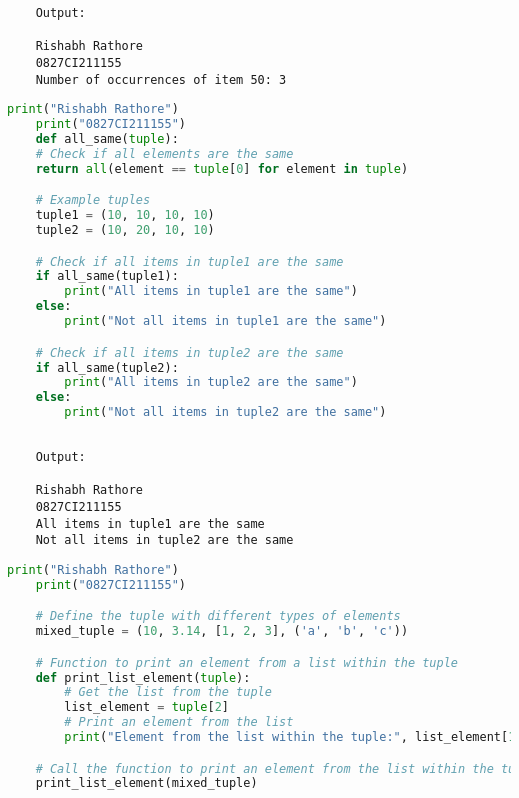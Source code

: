 \documentclass{report}
\begin{document}
\begin{verbatim}
	Output:

	Rishabh Rathore
	0827CI211155
	Number of occurrences of item 50: 3
\end{verbatim}



\bigskip

\sol 
\begin{lstlisting}[language=Python]
	print("Rishabh Rathore")
	print("0827CI211155")
	def all_same(tuple):
    # Check if all elements are the same
    return all(element == tuple[0] for element in tuple)

	# Example tuples
	tuple1 = (10, 10, 10, 10)
	tuple2 = (10, 20, 10, 10)

	# Check if all items in tuple1 are the same
	if all_same(tuple1):
		print("All items in tuple1 are the same")
	else:
		print("Not all items in tuple1 are the same")

	# Check if all items in tuple2 are the same
	if all_same(tuple2):
		print("All items in tuple2 are the same")
	else:
		print("Not all items in tuple2 are the same")
  

\end{lstlisting}

\begin{verbatim}
	Output:

	Rishabh Rathore
	0827CI211155
	All items in tuple1 are the same
	Not all items in tuple2 are the same

\end{verbatim}




\bigskip

\sol 
\begin{lstlisting}[language=Python]
	print("Rishabh Rathore")
	print("0827CI211155")

	# Define the tuple with different types of elements
	mixed_tuple = (10, 3.14, [1, 2, 3], ('a', 'b', 'c'))

	# Function to print an element from a list within the tuple
	def print_list_element(tuple):
		# Get the list from the tuple
		list_element = tuple[2]
		# Print an element from the list
		print("Element from the list within the tuple:", list_element[1])

	# Call the function to print an element from the list within the tuple
	print_list_element(mixed_tuple)

\end{lstlisting}
\end{document}
